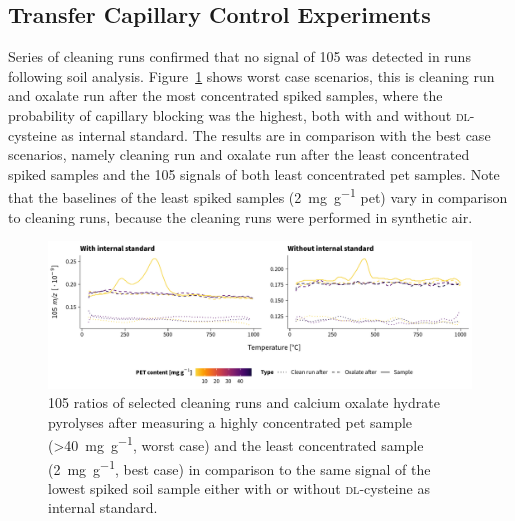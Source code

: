 \subsection{Transfer Capillary Control Experiments}

Series of cleaning runs confirmed that no signal of \SI{105}{\mz} was detected in runs following soil analysis. Figure~\ref{fig:tga-capillary-checks} shows worst case scenarios, this is cleaning run and oxalate run after the most concentrated spiked samples, where the probability of capillary blocking was the highest, both with and without \textsc{dl}-cysteine as internal standard.
The results are in comparison with the best case scenarios, namely cleaning run and oxalate run after the least concentrated spiked samples and the \SI{105}{\mz} signals of both least concentrated \ac{pet} samples.
Note that the baselines of the least spiked samples (\SI{2}{\milli\gram\per\gram} \ac{pet}) vary in comparison to cleaning runs, because the cleaning runs were performed in synthetic air.

\begin{figure}
	\includegraphics[width=\textwidth]{figures/tga-capillary-checks}
	\caption[\SI{105}{\mz} ratios of selected cleaning runs and calcium oxalate hydrate pyrolyses after measuring a highly concentrated \ac{pet} sample and the least concentrated sample with or without internal standard.]{\SI{105}{\mz} ratios of selected cleaning runs and calcium oxalate hydrate pyrolyses after measuring a highly concentrated \ac{pet} sample (\SI{>40}{\milli\gram\per\gram}, worst case) and the least concentrated sample (\SI{2}{\milli\gram\per\gram}, best case) in comparison to the same signal of the lowest spiked soil sample either with or without \textsc{dl}-cysteine as internal standard.}
	\label{fig:tga-capillary-checks}
\end{figure}


